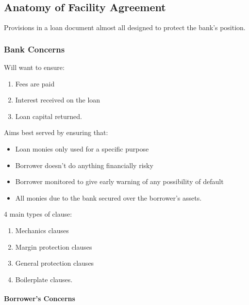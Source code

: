 \documentclass[
]{article}
\providecommand{\tightlist}{%
  \setlength{\itemsep}{0pt}\setlength{\parskip}{0pt}}
\begin{document}
\hypertarget{anatomy-of-facility-agreement}{%
\subsection{Anatomy of Facility
Agreement}\label{anatomy-of-facility-agreement}}

Provisions in a loan document almost all designed to protect the bank's
position.

\hypertarget{bank-concerns}{%
\subsubsection{Bank Concerns}\label{bank-concerns}}

Will want to ensure:

\begin{enumerate}
\tightlist
\item
  Fees are paid
\item
  Interest received on the loan
\item
  Loan capital returned.
\end{enumerate}

Aims best served by ensuring that:

\begin{itemize}
\tightlist
\item
  Loan monies only used for a specific purpose
\item
  Borrower doesn't do anything financially risky
\item
  Borrower monitored to give early warning of any possibility of default
\item
  All monies due to the bank secured over the borrower's assets.
\end{itemize}

4 main types of clause:

\begin{enumerate}
\tightlist
\item
  Mechanics clauses
\item
  Margin protection clauses
\item
  General protection clauses
\item
  Boilerplate clauses.
\end{enumerate}

\hypertarget{borrowers-concerns}{%
\paragraph{Borrower's Concerns}\label{borrowers-concerns}}
\end{document}

